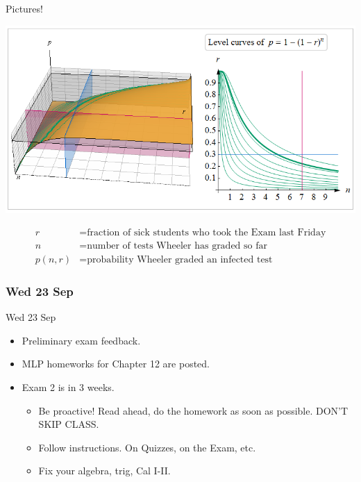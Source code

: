 \documentclass[12pt]{beamer}
\theoremstyle{plain}
\theoremstyle{definition}
\begin{document}
\begin{frame}[allowframebreaks]{\small Pictures!}{}
\begin{center}
\includegraphics[scale=0.4]{12-2levCurvesAppl}
\end{center}
\vspace{-1pc}
\[\begin{split}
r &=\text{fraction of sick students who took the Exam last Friday} \\
n &= \text{number of tests Wheeler has graded so far} \\
p(n,r) &=\text{probability Wheeler graded an infected test}
\end{split}\]
\end{frame}

\subsubsection{Wed 23 Sep}
\begin{frame}{Wed 23 Sep}%
\begin{itemize}
\item Preliminary exam feedback.
\item MLP homeworks for Chapter 12 are posted.
\item Exam 2 is in 3 weeks.
	\begin{itemize}
	\item Be proactive!  Read ahead, do the homework as soon as possible.  DON'T SKIP CLASS.
	\item Follow instructions.  On Quizzes, on the Exam, etc.
	\item Fix your algebra, trig, Cal I-II.
	\end{itemize}
\end{itemize}
\end{frame}
\end{document}
